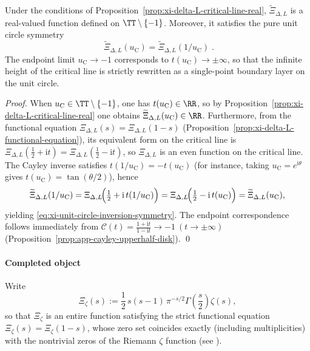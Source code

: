 \begin{proposition}\label{prop:xi-nonperiodic-phase-symmetry}
Under the conditions of Proposition~\ref{prop:xi-delta-L-critical-line-real}, \(\widetilde{\Xi}_{\Delta,L}\) is a real-valued function defined on \(\TT\setminus\{-1\}\).
Moreover, it satisfies the pure unit circle symmetry
\begin{equation}\label{eq:xi-unit-circle-inversion-symmetry}
\boxed{\;
\widetilde{\Xi}_{\Delta,L}(u_{\mathrm C})
=\widetilde{\Xi}_{\Delta,L}(1/u_{\mathrm C})\; }.
\end{equation}
The endpoint limit \(u_{\mathrm C}\to-1\) corresponds to \(t(u_{\mathrm C})\to\pm\infty\), so that the infinite height of the critical line is strictly rewritten as a single-point boundary layer on the unit circle.
\end{proposition}
\begin{proof}
When \(u_{\mathrm C}\in\TT\setminus\{-1\}\), one has \(t(u_{\mathrm C})\in\RR\), so by Proposition~\ref{prop:xi-delta-L-critical-line-real} one obtains \(\widetilde{\Xi}_{\Delta,L}(u_{\mathrm C})\in\RR\).
Furthermore, from the functional equation \(\Xi_{\Delta,L}(s)=\Xi_{\Delta,L}(1-s)\) (Proposition~\ref{prop:xi-delta-L-functional-equation}), its equivalent form on the critical line is
\(
\Xi_{\Delta,L}(\tfrac12+\mathrm{i}t)=\Xi_{\Delta,L}(\tfrac12-\mathrm{i}t)
\),
so \(\Xi_{\Delta,L}\) is an even function on the critical line.
The Cayley inverse satisfies \(t(1/u_{\mathrm C})=-t(u_{\mathrm C})\) (for instance, taking \(u_{\mathrm C}=e^{\mathrm{i}\theta}\) gives \(t(u_{\mathrm C})=\tan(\theta/2)\)),
hence
\[
\widetilde{\Xi}_{\Delta,L}(1/u_{\mathrm C})
=\Xi_{\Delta,L}\!\Bigl(\tfrac12+\mathrm{i}\,t(1/u_{\mathrm C})\Bigr)
=\Xi_{\Delta,L}\!\Bigl(\tfrac12-\mathrm{i}\,t(u_{\mathrm C})\Bigr)
=\widetilde{\Xi}_{\Delta,L}(u_{\mathrm C}),
\]
yielding \eqref{eq:xi-unit-circle-inversion-symmetry}.
The endpoint correspondence follows immediately from \(\mathcal{C}(t)=\frac{1+\mathrm{i}t}{1-\mathrm{i}t}\to-1\ (t\to\pm\infty)\) (Proposition~\ref{prop:app-cayley-upperhalf-disk}). \qed
\end{proof}

\paragraph{Completed object}
Write
\begin{equation}\label{eq:app-xi-classical}
\Xi_{\zeta}(s):=\frac12\,s(s-1)\,\pi^{-s/2}\Gamma\!\left(\frac{s}{2}\right)\zeta(s),
\end{equation}
so that \(\Xi_{\zeta}\) is an entire function satisfying the strict functional equation \(\Xi_{\zeta}(s)=\Xi_{\zeta}(1-s)\), whose zero set coincides exactly (including multiplicities) with the nontrivial zeros of the Riemann \(\zeta\) function (see \cite{Apostol1976}).


